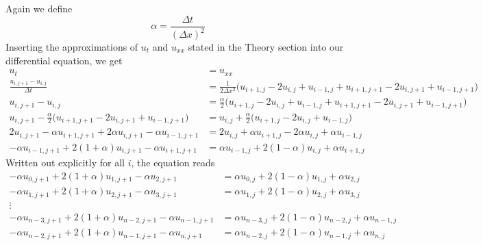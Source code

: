 \documentclass[reprint, english,notitlepage,nofootinbib]{revtex4-1}  %
\begin{document}
Again we define
\begin{equation*}
  \alpha = \frac{\Delta t}{(\Delta x)^2}
\end{equation*}
Inserting the approximations of $u_t$ and $u_{xx}$ stated in the Theory section into our differential equation, we get
\begin{align*}
  u_t &= u_{xx} \\
  \frac{u_{i, j+1} - u_{i, j}}{\Delta t}
    &= \frac{1}{2 \Delta x^2} \bigg(u_{i+1, j} - 2u_{i,j} + u_{i-1, j}
      + u_{i+1, j + 1} - 2u_{i, j + 1} + u_{i - 1, j + 1} \bigg) \\
  u_{i, j+1} - u_{i, j} &= \frac{\alpha}{2} \bigg(u_{i+1, j} - 2u_{i,j} + u_{i-1, j}
      + u_{i+1, j+1} - 2u_{i, j+1} + u_{i-1, j+1} \bigg) \\
  u_{i, j+1} - \frac{\alpha}{2} \bigg( u_{i+1, j+1} - 2u_{i, j+1} + u_{i-1, j+1} \bigg)
    &= u_{i, j} + \frac{\alpha}{2} \bigg(u_{i+1, j}  - 2u_{i,j} + u_{i-1, j} \bigg) \\
  2 u_{i, j+1} - \alpha u_{i+1, j+1} + 2 \alpha u_{i, j+1} - \alpha u_{i-1, j+1}
    &= 2 u_{i, j} + \alpha u_{i+1, j}  - 2 \alpha u_{i,j} + \alpha u_{i-1, j} \\
  - \alpha u_{i-1, j+1} + 2 (1 + \alpha) u_{i, j+1} - \alpha u_{i+1, j+1}
    &= \alpha u_{i-1, j}  + 2 (1 - \alpha) u_{i,j} + \alpha u_{i+1, j}
\end{align*}
Written out explicitly for all $i$, the equation reads
\begin{align*}
  - \alpha u_{0, j+1} + 2 (1 + \alpha) u_{1, j+1} - \alpha u_{2, j+1}
    &= \alpha u_{0, j}  + 2 (1 - \alpha) u_{1,j} + \alpha u_{2, j} \\
  - \alpha u_{1, j+1} + 2 (1 + \alpha) u_{2, j+1} - \alpha u_{3, j+1}
    &= \alpha u_{1, j}  + 2 (1 - \alpha) u_{2,j} + \alpha u_{3, j} \\
    \vdots \\
  - \alpha u_{n-3, j+1} + 2 (1 + \alpha) u_{n-2, j+1} - \alpha u_{n-1, j+1}
    &= \alpha u_{n-3, j}  + 2 (1 - \alpha) u_{n-2,j} + \alpha u_{n-1, j} \\
  - \alpha u_{n-2, j+1} + 2 (1 + \alpha) u_{n-1, j+1} - \alpha u_{n, j+1}
    &= \alpha u_{n-2, j}  + 2 (1 - \alpha) u_{n-1,j} + \alpha u_{n, j}
\end{align*}
\end{document}
